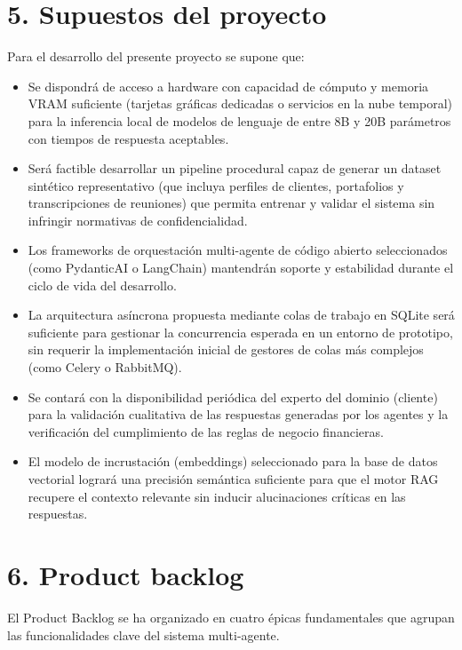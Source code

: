 \documentclass[
11pt, %
]{charter}
\begin{document}
\section{5. Supuestos del proyecto}
\label{sec:supuestos}

Para el desarrollo del presente proyecto se supone que:

\begin{itemize}
    \item Se dispondrá de acceso a hardware con capacidad de cómputo y memoria VRAM suficiente (tarjetas gráficas dedicadas o servicios en la nube temporal) para la inferencia local de modelos de lenguaje de entre 8B y 20B parámetros con tiempos de respuesta aceptables.
    \item Será factible desarrollar un pipeline procedural capaz de generar un dataset sintético representativo (que incluya perfiles de clientes, portafolios y transcripciones de reuniones) que permita entrenar y validar el sistema sin infringir normativas de confidencialidad.
    \item Los frameworks de orquestación multi-agente de código abierto seleccionados (como PydanticAI o LangChain) mantendrán soporte y estabilidad durante el ciclo de vida del desarrollo.
    \item La arquitectura asíncrona propuesta mediante colas de trabajo en SQLite será suficiente para gestionar la concurrencia esperada en un entorno de prototipo, sin requerir la implementación inicial de gestores de colas más complejos (como Celery o RabbitMQ).
    \item Se contará con la disponibilidad periódica del experto del dominio (cliente) para la validación cualitativa de las respuestas generadas por los agentes y la verificación del cumplimiento de las reglas de negocio financieras.
    \item El modelo de incrustación (embeddings) seleccionado para la base de datos vectorial logrará una precisión semántica suficiente para que el motor RAG recupere el contexto relevante sin inducir alucinaciones críticas en las respuestas.
\end{itemize}

\section{6. Product backlog}
\label{sec:backlog}

El Product Backlog se ha organizado en cuatro épicas fundamentales que agrupan las funcionalidades clave del sistema multi-agente. 
\end{document}
